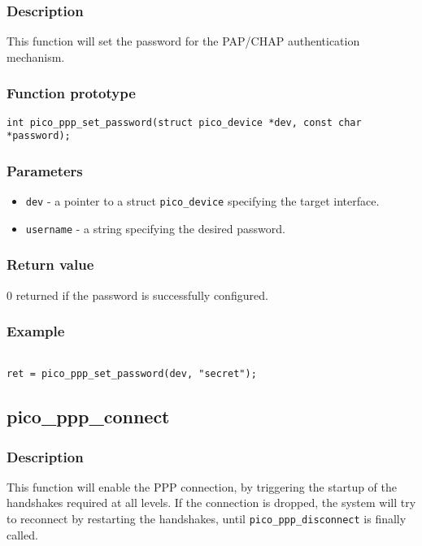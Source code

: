\subsubsection*{Description}
This function will set the password for the PAP/CHAP authentication mechanism.  

\subsubsection*{Function prototype}
\texttt{int pico\_ppp\_set\_password(struct pico\_device *dev, const char *password); }

\subsubsection*{Parameters}
\begin{itemize}[noitemsep]
\item \texttt{dev} - a pointer to a struct \texttt{pico\_device} specifying the target interface.
\item \texttt{username} - a string specifying the desired password.
\end{itemize}

\subsubsection*{Return value}
0 returned if the password is successfully configured.

\subsubsection*{Example}
\begin{verbatim}

ret = pico_ppp_set_password(dev, "secret");
\end{verbatim}

\subsection{pico\_ppp\_connect}
\subsubsection*{Description}
This function will enable the PPP connection, by triggering the startup of the handshakes
required at all levels. If the connection is dropped, the system will try to reconnect by restarting
the handshakes, until \texttt{pico\_ppp\_disconnect} is finally called.


